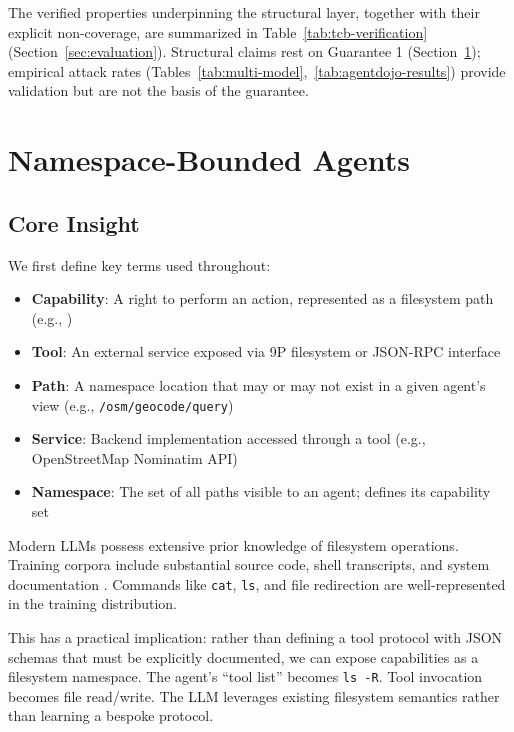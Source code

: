 \documentclass[acmsmall,screen,review]{acmart}
\begin{document}
The verified properties underpinning the structural layer, together with their explicit non-coverage, are summarized in Table~\ref{tab:tcb-verification} (Section~\ref{sec:evaluation}). Structural claims rest on Guarantee 1 (Section~\ref{sec:design}); empirical attack rates (Tables~\ref{tab:multi-model},~\ref{tab:agentdojo-results}) provide validation but are not the basis of the guarantee.

\section{Namespace-Bounded Agents}
\label{sec:design}

\subsection{Core Insight}

We first define key terms used throughout:

\begin{itemize}
    \item \textbf{Capability}: A right to perform an action, represented as a filesystem path (e.g., )
    \item \textbf{Tool}: An external service exposed via 9P filesystem or JSON-RPC interface
    \item \textbf{Path}: A namespace location that may or may not exist in a given agent's view (e.g., \texttt{/osm/geocode/query})
    \item \textbf{Service}: Backend implementation accessed through a tool (e.g., OpenStreetMap Nominatim API)
    \item \textbf{Namespace}: The set of all paths visible to an agent; defines its capability set
\end{itemize}

Modern LLMs possess extensive prior knowledge of filesystem operations. Training corpora include substantial source code, shell transcripts, and system documentation \cite{chen2021codex,roziere2023codellama,kocetkov2022stack}. Commands like \texttt{cat}, \texttt{ls}, and file redirection are well-represented in the training distribution.

This has a practical implication: rather than defining a tool protocol with JSON schemas that must be explicitly documented, we can expose capabilities as a filesystem namespace. The agent's ``tool list'' becomes \texttt{ls -R}. Tool invocation becomes file read/write. The LLM leverages existing filesystem semantics rather than learning a bespoke protocol.
\end{document}
